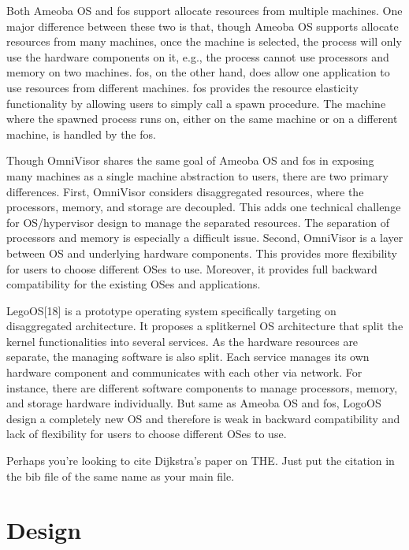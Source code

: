 \documentclass[twocolumn]{article}
\begin{document}
    Both Ameoba OS and fos support allocate resources from multiple machines. One major difference between these two is that, though Ameoba OS supports allocate resources from many machines, once the machine is selected, the process will only use the hardware components on it, e.g., the process cannot use processors and memory on two machines.  fos, on the other hand, does allow one application to use resources from different machines. fos provides the resource elasticity functionality by allowing users to simply call a spawn procedure. The machine where the spawned process runs on, either on the same machine or on a different machine, is handled by the fos. \par
    Though OmniVisor shares the same goal of Ameoba OS and fos in exposing many machines as a single machine abstraction to users, there are two primary differences. First, OmniVisor considers disaggregated resources, where the processors, memory, and storage are decoupled. This adds one technical challenge for OS/hypervisor design to manage the separated resources. The separation of processors and memory is especially a difficult issue. Second, OmniVisor is a layer between OS and underlying hardware components. This provides more flexibility for users to choose different OSes to use. Moreover, it provides full backward compatibility for the existing OSes and applications. \par
    LegoOS[18] is a prototype operating system specifically targeting on disaggregated architecture. It proposes a splitkernel OS architecture that split the kernel functionalities into several services. As the hardware resources are separate, the managing software is also split. Each service manages its own hardware component and communicates with each other via network. For instance, there are different software components to manage processors, memory, and storage hardware individually. But same as Ameoba OS and fos, LogoOS design a completely new OS and therefore is weak in backward compatibility and lack of flexibility for users to choose different OSes to use. \par

Perhaps you're looking to cite Dijkstra's paper on
THE\cite{DBLP:journals/cacm/Dijkstra68}.  Just put the citation in the bib file of the same name as your main file.

\section{Design}
\end{document}
